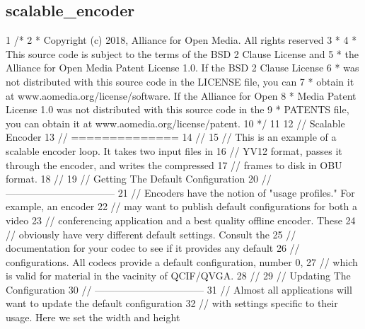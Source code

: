  \hypertarget{example_scalable_encoder}{}\subsection{scalable\+\_\+encoder}\label{example_scalable_encoder}

\begin{DoxyCodeInclude}
1 \textcolor{comment}{/*}
2 \textcolor{comment}{ * Copyright (c) 2018, Alliance for Open Media. All rights reserved}
3 \textcolor{comment}{ *}
4 \textcolor{comment}{ * This source code is subject to the terms of the BSD 2 Clause License and}
5 \textcolor{comment}{ * the Alliance for Open Media Patent License 1.0. If the BSD 2 Clause License}
6 \textcolor{comment}{ * was not distributed with this source code in the LICENSE file, you can}
7 \textcolor{comment}{ * obtain it at www.aomedia.org/license/software. If the Alliance for Open}
8 \textcolor{comment}{ * Media Patent License 1.0 was not distributed with this source code in the}
9 \textcolor{comment}{ * PATENTS file, you can obtain it at www.aomedia.org/license/patent.}
10 \textcolor{comment}{ */}
11 
12 \textcolor{comment}{// Scalable Encoder}
13 \textcolor{comment}{// ==============}
14 \textcolor{comment}{//}
15 \textcolor{comment}{// This is an example of a scalable encoder loop. It takes two input files in}
16 \textcolor{comment}{// YV12 format, passes it through the encoder, and writes the compressed}
17 \textcolor{comment}{// frames to disk in OBU format.}
18 \textcolor{comment}{//}
19 \textcolor{comment}{// Getting The Default Configuration}
20 \textcolor{comment}{// ---------------------------------}
21 \textcolor{comment}{// Encoders have the notion of "usage profiles." For example, an encoder}
22 \textcolor{comment}{// may want to publish default configurations for both a video}
23 \textcolor{comment}{// conferencing application and a best quality offline encoder. These}
24 \textcolor{comment}{// obviously have very different default settings. Consult the}
25 \textcolor{comment}{// documentation for your codec to see if it provides any default}
26 \textcolor{comment}{// configurations. All codecs provide a default configuration, number 0,}
27 \textcolor{comment}{// which is valid for material in the vacinity of QCIF/QVGA.}
28 \textcolor{comment}{//}
29 \textcolor{comment}{// Updating The Configuration}
30 \textcolor{comment}{// ---------------------------------}
31 \textcolor{comment}{// Almost all applications will want to update the default configuration}
32 \textcolor{comment}{// with settings specific to their usage. Here we set the width and height}

\end{DoxyCodeInclude}
